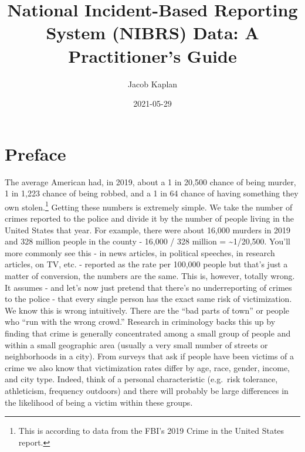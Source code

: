 \documentclass[
  12pt,
  openany]{book}
\title{National Incident-Based Reporting System (NIBRS) Data: A Practitioner's Guide}
\author{Jacob Kaplan}
\date{2021-05-29}
\begin{document}
\maketitle

{
\hypersetup{linkcolor=}
\setcounter{tocdepth}{2}
\tableofcontents
}
\listoffigures
{}
\hypertarget{preface}{%
\chapter{Preface}\label{preface}}

The average American had, in 2019, about a 1 in 20,500 chance of being murder, 1 in 1,223 chance of being robbed, and a 1 in 64 chance of having something they own stolen.\footnote{This is according to data from the FBI's 2019 Crime in the United States report.} Getting these numbers is extremely simple. We take the number of crimes reported to the police and divide it by the number of people living in the United States that year. For example, there were about 16,000 murders in 2019 and 328 million people in the county - 16,000 / 328 million = \textasciitilde1/20,500. You'll more commonly see this - in news articles, in political speeches, in research articles, on TV, etc. - reported as the rate per 100,000 people but that's just a matter of conversion, the numbers are the same. This is, however, totally wrong. It assumes - and let's now just pretend that there's no underreporting of crimes to the police - that every single person has the exact same risk of victimization. We know this is wrong intuitively. There are the ``bad parts of town'' or people who ``run with the wrong crowd.'' Research in criminology backs this up by finding that crime is generally concentrated among a small group of people and within a small geographic area (usually a very small number of streets or neighborhoods in a city). From surveys that ask if people have been victims of a crime we also know that victimization rates differ by age, race, gender, income, and city type. Indeed, think of a personal characteristic (e.g.~risk tolerance, athleticism, frequency outdoors) and there will probably be large differences in the likelihood of being a victim within these groups.
\end{document}
